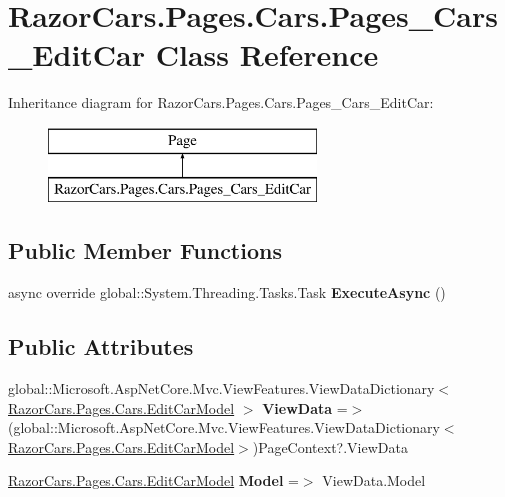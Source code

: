 \hypertarget{class_razor_cars_1_1_pages_1_1_cars_1_1_pages___cars___edit_car}{}\section{Razor\+Cars.\+Pages.\+Cars.\+Pages\+\_\+\+Cars\+\_\+\+Edit\+Car Class Reference}
\label{class_razor_cars_1_1_pages_1_1_cars_1_1_pages___cars___edit_car}
Inheritance diagram for Razor\+Cars.\+Pages.\+Cars.\+Pages\+\_\+\+Cars\+\_\+\+Edit\+Car\+:\begin{figure}[H]
\begin{center}
\leavevmode
\includegraphics[height=2.000000cm]{class_razor_cars_1_1_pages_1_1_cars_1_1_pages___cars___edit_car}
\end{center}
\end{figure}
\subsection*{Public Member Functions}
\begin{DoxyCompactItemize}
\item 
\mbox{\label{class_razor_cars_1_1_pages_1_1_cars_1_1_pages___cars___edit_car_af5c2fd40c015e477746aaa2313bfcd36}} 
async override global\+::\+System.\+Threading.\+Tasks.\+Task {\bfseries Execute\+Async} ()
\end{DoxyCompactItemize}
\subsection*{Public Attributes}
\begin{DoxyCompactItemize}
\item 
\mbox{\label{class_razor_cars_1_1_pages_1_1_cars_1_1_pages___cars___edit_car_a595e6d4da6ccb1bd28803695b7914c50}} 
global\+::\+Microsoft.\+Asp\+Net\+Core.\+Mvc.\+View\+Features.\+View\+Data\+Dictionary$<$ \mbox{\hyperlink{class_razor_cars_1_1_pages_1_1_cars_1_1_edit_car_model}{Razor\+Cars.\+Pages.\+Cars.\+Edit\+Car\+Model}} $>$ {\bfseries View\+Data} =$>$ (global\+::\+Microsoft.\+Asp\+Net\+Core.\+Mvc.\+View\+Features.\+View\+Data\+Dictionary$<$\mbox{\hyperlink{class_razor_cars_1_1_pages_1_1_cars_1_1_edit_car_model}{Razor\+Cars.\+Pages.\+Cars.\+Edit\+Car\+Model}}$>$)Page\+Context?.View\+Data
\item 
\mbox{\label{class_razor_cars_1_1_pages_1_1_cars_1_1_pages___cars___edit_car_a9f8c34367a0d8d0aa83e15eda6daa4ab}} 
\mbox{\hyperlink{class_razor_cars_1_1_pages_1_1_cars_1_1_edit_car_model}{Razor\+Cars.\+Pages.\+Cars.\+Edit\+Car\+Model}} {\bfseries Model} =$>$ View\+Data.\+Model
\end{DoxyCompactItemize}
